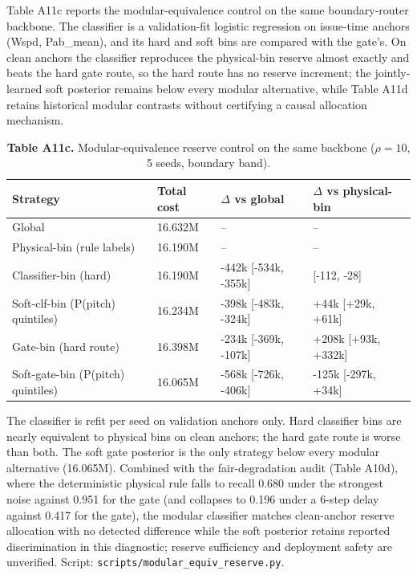 \documentclass[
  journal]{IEEEtran}
\begin{document}
Table A11c reports the modular-equivalence control on the same
boundary-router backbone. The classifier is a validation-fit logistic
regression on issue-time anchors (Wspd, Pab\_mean), and its hard and
soft bins are compared with the gate's. On clean anchors the classifier
reproduces the physical-bin reserve almost exactly and beats the hard
gate route, so the hard route has no reserve increment; the
jointly-learned soft posterior remains below every modular alternative,
while Table A11d retains historical modular contrasts without certifying
a causal allocation mechanism.

\begin{table}[!t]
\centering
\fontsize{8.0pt}{9.6pt}\selectfont
\setlength{\tabcolsep}{2.4pt}
\renewcommand{\arraystretch}{1.03}
\caption*{\textbf{Table A11c.} Modular-equivalence reserve control on the same backbone ($\rho=10$, 5 seeds, boundary band).}
\begin{tabularx}{\linewidth}{>{\raggedright\arraybackslash}X >{\centering\arraybackslash}p{} >{\centering\arraybackslash}p{} >{\centering\arraybackslash}p{}}
\toprule
Strategy & Total cost & $\Delta$ vs global & $\Delta$ vs physical-bin \\
\midrule
Global & 16.632M & -- & -- \\
Physical-bin (rule labels) & 16.190M & -- & -- \\
Classifier-bin (hard) & 16.190M & -442k [-534k, -355k] & -68 [-112, -28] \\
Soft-clf-bin (P(pitch) quintiles) & 16.234M & -398k [-483k, -324k] & +44k [+29k, +61k] \\
Gate-bin (hard route) & 16.398M & -234k [-369k, -107k] & +208k [+93k, +332k] \\
Soft-gate-bin (P(pitch) quintiles) & 16.065M & -568k [-726k, -406k] & -125k [-297k, +34k] \\
\bottomrule
\end{tabularx}
\vspace{1mm}
\fontsize{8.0pt}{9.6pt}\selectfont The classifier is refit per seed on validation anchors only. Hard classifier bins are nearly equivalent to physical bins on clean anchors; the hard gate route is worse than both. The soft gate posterior is the only strategy below every modular alternative (16.065M). Combined with the fair-degradation audit (Table A10d), where the deterministic physical rule falls to recall 0.680 under the strongest noise against 0.951 for the gate (and collapses to 0.196 under a 6-step delay against 0.417 for the gate), the modular classifier matches clean-anchor reserve allocation with no detected difference while the soft posterior retains reported discrimination in this diagnostic; reserve sufficiency and deployment safety are unverified. Script: \texttt{scripts/modular\_equiv\_reserve.py}.
\end{table}
\end{document}

